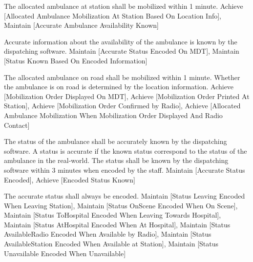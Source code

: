   \startkaosspec
  	 {The allocated ambulance at station shall be mobilized within 1 minute.}
  	 {Achieve [Allocated Ambulance Mobilization At Station Based On Location Info], Maintain [Accurate Ambulance Availability Known]}
  \stopkaosspec
  
  
    {}

  \startkaosspec
  	 {Accurate information about the availability of the ambulance is known by the dispatching software.}
  	 {Maintain [Accurate Status Encoded On MDT], Maintain [Status Known Based On Encoded Information]}
  \stopkaosspec

  \startkaosspec
  	 {The allocated ambulance on road shall be mobilized within 1 minute. Whether the ambulance is on road is determined by the location information.}
  	 {Achieve [Mobilization Order Displayed On MDT], Achieve [Mobilization Order Printed At Station], Achieve [Mobilization Order Confirmed by Radio], Achieve [Allocated Ambulance Mobilization When Mobilization Order Displayed And Radio Contact]}
  \stopkaosspec
  
  
    {}
    
  \startkaosspec
  	 {The status of the ambulance shall be accurately known by the dispatching software. A status is accurate if the known status correspond to the status of the ambulance in the real-world. The status shall be known by the dispatching software within 3 minutes when encoded by the staff.}
  	 {Maintain [Accurate Status Encoded], Achieve [Encoded Status Known]}
  \stopkaosspec

  \startkaosspec
  	 {The accurate status shall always be encoded.}
  	 {Maintain [Status Leaving Encoded When Leaving Station], Maintain [Status OnScene Encoded When On Scene], Maintain [Status ToHospital Encoded When Leaving Towards Hospital], Maintain [Status AtHospital Encoded When At Hospital], Maintain [Status AvailableRadio Encoded When Available by Radio], Maintain [Status AvailableStation Encoded When Available at Station], Maintain [Status Unavailable Encoded When Unavailable]}
  \stopkaosspec
  
